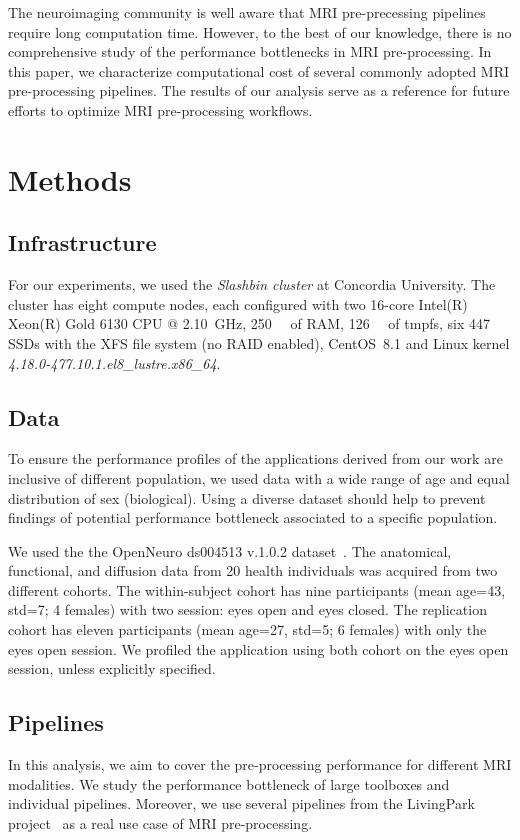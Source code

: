 \documentclass[conference]{IEEEtran}
\begin{document}
The neuroimaging community is well aware that MRI pre-precessing pipelines require long computation time. However, to the best of our knowledge, there is no comprehensive study of the performance bottlenecks in MRI pre-processing. In this paper, we characterize computational cost of several commonly adopted MRI pre-processing pipelines. The results of our analysis serve as a reference for future efforts to optimize MRI pre-processing workflows.

\section{Methods}
\subsection{Infrastructure}
For our experiments, we used the \textit{Slashbin cluster} at Concordia University. The cluster has eight compute nodes, each configured with two 16-core Intel(R) Xeon(R) Gold 6130 CPU @ \SI{2.10}{\giga\hertz}, \SI{250}{\gibi\byte} of RAM, \SI{126}{\gibi\byte} of tmpfs, six \SI{447}{\gibi\byte} SSDs with the XFS file system (no RAID enabled), CentOS~8.1 and Linux kernel \textit{4.18.0-477.10.1.el8\_lustre.x86\_64}.

\subsection{Data}
To ensure the performance profiles of the applications derived from our work are inclusive of different population, we used data with a wide range of age and equal distribution of sex (biological). Using a diverse dataset should help to prevent findings of potential performance bottleneck associated to a specific population.

We used the the OpenNeuro ds004513 v.1.0.2 dataset~\cite{ds004513:1.0.2}. The anatomical, functional, and diffusion data from 20 health individuals was acquired from two different cohorts. The within-subject cohort has nine participants (mean age=43, std=7; 4 females) with two session: eyes open and eyes closed. The replication cohort has eleven participants (mean age=27, std=5; 6 females) with only the eyes open session. We profiled the application using both cohort on the eyes open session, unless explicitly specified.

\subsection{Pipelines}
In this analysis, we aim to cover the pre-processing performance for different MRI modalities. We study the performance bottleneck of large toolboxes and individual pipelines. Moreover, we use several pipelines from the LivingPark project~\cite{livingpark} as a real use case of MRI pre-processing.
\end{document}
